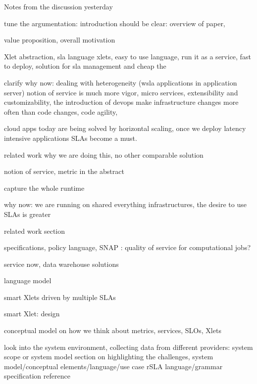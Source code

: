 Notes from the discussion yesterday

tune the argumentation: introduction should be clear: overview of paper, 

value proposition, overall motivation

Xlet abstraction, 
sla language  xlets, easy to use language, run it as a service, fast to deploy, solution for sla management and cheap the 

clarify why now: dealing with heterogeneity (wsla applications in application server) notion of service is much more vigor, micro services,  extensibility and customizability, the introduction of devops make infrastructure changes more often than code changes, code agility, 

cloud apps today are being solved by horizontal scaling, once we deploy latency intensive applications SLAs become a must. 

related work why we are doing this, no other comparable solution

notion of service, metric in the abstract

capture the whole runtime

why now: we are running on shared everything infrastructures, the desire to use SLAs is greater

related work section

specifications, policy language, SNAP : quality of service for computational jobs? 

service now, data warehouse solutions

language model

smart Xlets driven by multiple SLAs

smart Xlet: design 

conceptual model on how we think about metrics, services, SLOs, Xlets

look into the system environment, collecting data from different providers: system scope or system model 
section on highlighting the challenges, 
system model/conceptual elements/language/use case
rSLA language/grammar specification reference 



